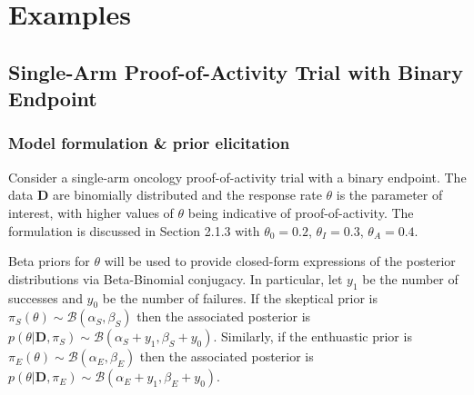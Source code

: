 \documentclass[12pt]{article}
\begin{document}



%


\newpage
\section{Examples}

\subsection{Single-Arm Proof-of-Activity Trial with Binary Endpoint}

\subsubsection{Model formulation \& prior elicitation}

Consider a single-arm oncology proof-of-activity trial with a binary endpoint. The data $\mathbf{D}$ are binomially distributed and the response rate $\theta$ is the parameter of interest, with higher values of $\theta$ being indicative of proof-of-activity. The formulation is discussed in Section 2.1.3 with $\theta_0=0.2$, $\theta_I=0.3$, $\theta_A=0.4$.

Beta priors for $\theta$ will be used to provide closed-form expressions of the posterior distributions via Beta-Binomial conjugacy. In particular, let $y_1$ be the number of successes and $y_0$ be the number of failures. If the skeptical prior is $\pi_S(\theta)\sim\mathcal{B}(\alpha_S,\beta_S)$ then the associated posterior is $p(\theta|\mathbf{D},\pi_S)\sim\mathcal{B}(\alpha_S+y_1,\beta_S+y_0)$. Similarly, if the enthuastic prior is $\pi_E(\theta)\sim\mathcal{B}(\alpha_E,\beta_E)$ then the associated posterior is $p(\theta|\mathbf{D},\pi_E)\sim\mathcal{B}(\alpha_E+y_1,\beta_E+y_0)$.
\end{document}
